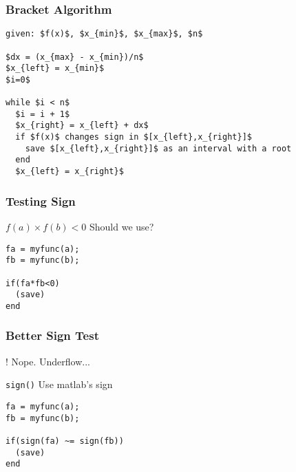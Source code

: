 \documentclass[10pt]{beamer}
\begin{document}
\begin{frame}[fragile]
\frametitle{Bracket Algorithm}
\begin{lstlisting}[mathescape, caption=Bracket Algorithm]
given: $f(x)$, $x_{min}$, $x_{max}$, $n$

$dx = (x_{max} - x_{min})/n$
$x_{left} = x_{min}$
$i=0$

while $i < n$
  $i = i + 1$
  $x_{right} = x_{left} + dx$
  if $f(x)$ changes sign in $[x_{left},x_{right}]$
    save $[x_{left},x_{right}]$ as an interval with a root
  end
  $x_{left} = x_{right}$
\end{lstlisting}
\end{frame}
\begin{frame}[containsverbatim]
\frametitle{Testing Sign}
\begin{block}{$f(a) \times f(b) < 0$}
Should we use?

\begin{verbatim}
fa = myfunc(a);
fb = myfunc(b);

if(fa*fb<0)
  (save)
end
\end{verbatim}
\end{block}
\end{frame}
\begin{frame}[containsverbatim]
\frametitle{Better Sign Test}
\begin{alertblock}{!}
Nope.  Underflow...
\end{alertblock}

\begin{block}{\texttt{sign()}}
Use matlab's sign

\begin{verbatim}
fa = myfunc(a);
fb = myfunc(b);

if(sign(fa) ~= sign(fb))
  (save)
end
\end{verbatim}
\end{block}
\end{frame}
\end{document}
